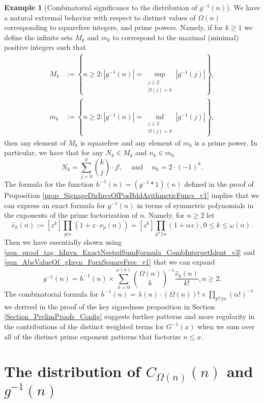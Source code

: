 \documentclass[11pt,reqno,a4letter]{article}
\numberwithin{figure}{section}
\numberwithin{table}{section}
\theoremstyle{plain}
\numberwithin{theorem}{section}
\theoremstyle{definition}
\newtheorem{example}[theorem]{Example}
\begin{document}
\begin{example}[Combinatorial significance to the distribution of $g^{-1}(n)$] 
We have a natural extremal behavior with respect to distinct values of $\Omega(n)$ 
corresponding to squarefree integers, and prime powers. Namely, if for $k \geq 1$ we define the 
infinite sets $M_k$ and $m_k$ to correspond to the maximal (minimal) positive integers such that 
\begin{align*} 
M_k & := \left\{n \geq 2: |g^{-1}(n)| = \underset{{\substack{j \geq 2 \\ \Omega(j) = k}}}{\operatorname{sup}} 
     |g^{-1}(j)|\right\}, \\  
m_k & := \left\{n \geq 2: |g^{-1}(n)| = \underset{{\substack{j \geq 2 \\ \Omega(j) = k}}}{\operatorname{inf}} 
     |g^{-1}(j)|\right\}, 
\end{align*} 
then any element of $M_k$ is squarefree and any element of $m_k$ is a prime power. 
In particular, we have that for any $N_k \in M_k$ and $n_k \in m_k$
\[
N_k = \sum_{j=0}^{k} \binom{k}{j} \cdot j!, \quad \mathrm{\ and\ } \quad n_k = 2 \cdot (-1)^{k}. 
\]
The formula for the function $h^{-1}(n) = (g^{-1} \ast 1)(n)$ defined in the proof of 
Proposition \ref{prop_SignageDirInvsOfPosBddArithmeticFuncs_v1} implies that we can express 
an exact formula for $g^{-1}(n)$ in terms of symmetric polynomials in the 
exponents of the prime factorization of $n$. 
Namely, for $n \geq 2$ let 
\[
\widehat{e}_k(n) := [z^k] \prod_{p|n} (1 + z \cdot \nu_p(n)) = [z^k] \prod_{p^{\alpha} || n} (1 + \alpha z), 
     0 \leq k \leq \omega(n). 
\]
Then we have essentially shown using 
\eqref{eqn_proof_tag_hInvn_ExactNestedSumFormula_CombInterpetIdent_v3} and 
\eqref{eqn_AbsValueOf_gInvn_FornSquareFree_v1} that we can expand 
\[
g^{-1}(n) = h^{-1}(n) \times \sum_{k=0}^{\omega(n)} \binom{\Omega(n)}{k}^{-1} 
     \frac{\widehat{e}_k(n)}{k!}, n \geq 2. 
\]
The combinatorial formula for 
$h^{-1}(n) = \lambda(n) \cdot (\Omega(n))! \times \prod_{p^{\alpha} || n} (\alpha !)^{-1}$ 
we derived in the proof of the key signedness proposition in 
Section \ref{Section_PrelimProofs_Config} 
suggests further patterns and more regularity in the contributions of the distinct weighted 
terms for $G^{-1}(x)$ when we sum over all of the distinct prime exponent patterns that factorize 
$n \leq x$. 
\end{example} 

\newpage
\section{The distribution of 
         $C_{\Omega(n)}(n)$ and $g^{-1}(n)$} 
\label{Section_NewFormulasForgInvn} 
\end{document}
